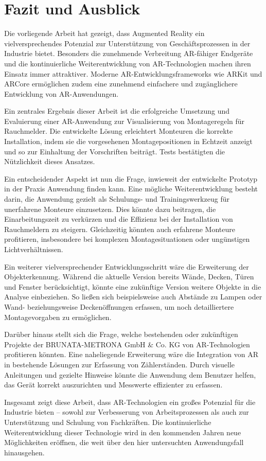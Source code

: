 \chapter{Fazit und Ausblick}

Die vorliegende Arbeit hat gezeigt, dass Augmented Reality ein vielversprechendes Potenzial zur Unterstützung von Geschäftsprozessen in der Industrie bietet. Besonders die zunehmende Verbreitung AR-fähiger Endgeräte und die kontinuierliche Weiterentwicklung von AR-Technologien machen ihren Einsatz immer attraktiver. Moderne AR-Entwicklungsframeworks wie ARKit und ARCore ermöglichen zudem eine zunehmend einfachere und zugänglichere Entwicklung von AR-Anwendungen.

Ein zentrales Ergebnis dieser Arbeit ist die erfolgreiche Umsetzung und Evaluierung einer AR-Anwendung zur Visualisierung von Montageregeln für Rauchmelder. Die entwickelte Lösung erleichtert Monteuren die korrekte Installation, indem sie die vorgesehenen Montagepositionen in Echtzeit anzeigt und so zur Einhaltung der Vorschriften beiträgt. Tests bestätigten die Nützlichkeit dieses Ansatzes.

Ein entscheidender Aspekt ist nun die Frage, inwieweit der entwickelte Prototyp in der Praxis Anwendung finden kann. Eine mögliche Weiterentwicklung besteht darin, die Anwendung gezielt als Schulungs- und Trainingswerkzeug für unerfahrene Monteure einzusetzen. Dies könnte dazu beitragen, die Einarbeitungszeit zu verkürzen und die Effizienz bei der Installation von Rauchmeldern zu steigern. Gleichzeitig könnten auch erfahrene Monteure profitieren, insbesondere bei komplexen Montagesituationen oder ungünstigen Lichtverhältnissen.

Ein weiterer vielversprechender Entwicklungsschritt wäre die Erweiterung der Objekterkennung. Während die aktuelle Version bereits Wände, Decken, Türen und Fenster berücksichtigt, könnte eine zukünftige Version weitere Objekte in die Analyse einbeziehen. So ließen sich beispielsweise auch Abstände zu Lampen oder Wand- beziehungsweise Deckenöffnungen erfassen, um noch detailliertere Montagevorgaben zu ermöglichen.

Darüber hinaus stellt sich die Frage, welche bestehenden oder zukünftigen Projekte der BRUNATA-METRONA GmbH \& Co. KG von AR-Technologien profitieren könnten. Eine naheliegende Erweiterung wäre die Integration von AR in bestehende Lösungen zur Erfassung von Zählerständen. Durch visuelle Anleitungen und gezielte Hinweise könnte die Anwendung dem Benutzer helfen, das Gerät korrekt auszurichten und Messwerte effizienter zu erfassen.

Insgesamt zeigt diese Arbeit, dass AR-Technologien ein großes Potenzial für die Industrie bieten – sowohl zur Verbesserung von Arbeitsprozessen als auch zur Unterstützung und Schulung von Fachkräften. Die kontinuierliche Weiterentwicklung dieser Technologie wird in den kommenden Jahren neue Möglichkeiten eröffnen, die weit über den hier untersuchten Anwendungsfall hinausgehen.